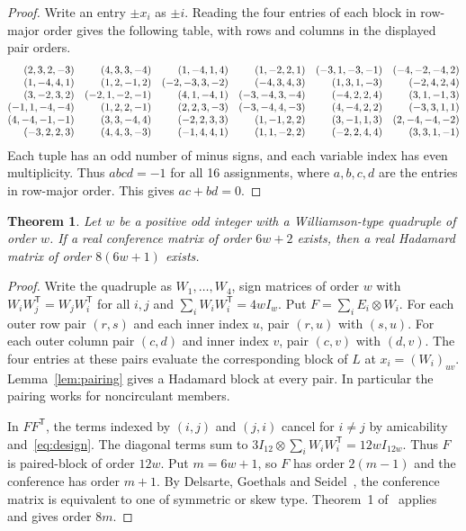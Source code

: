 \documentclass[10pt]{article}
\newtheorem{theorem}{Theorem}
\newcommand{\tr}{^{\mathsf T}}
\begin{document}
\begin{proof}
Write an entry $\pm x_i$ as $\pm i$. Reading the four entries of each block in row-major order gives the following table, with rows and columns in the displayed pair orders.
{\small
\[
\begin{array}{@{}rrrrrr@{}}
(2,3,2,-3)&(4,3,3,-4)&(1,-4,1,4)&(1,-2,2,1)&(-3,1,-3,-1)&(-4,-2,-4,2)\\
(1,-4,4,1)&(1,2,-1,2)&(-2,-3,3,-2)&(-4,3,4,3)&(1,3,1,-3)&(-2,4,2,4)\\
(3,-2,3,2)&(-2,1,-2,-1)&(4,1,-4,1)&(-3,-4,3,-4)&(-4,2,2,4)&(3,1,-1,3)\\
(-1,1,-4,-4)&(1,2,2,-1)&(2,2,3,-3)&(-3,-4,4,-3)&(4,-4,2,2)&(-3,3,1,1)\\
(4,-4,-1,-1)&(3,3,-4,4)&(-2,2,3,3)&(1,-1,2,2)&(3,-1,1,3)&(2,-4,-4,-2)\\
(-3,2,2,3)&(4,4,3,-3)&(-1,4,4,1)&(1,1,-2,2)&(-2,2,4,4)&(3,3,1,-1)
\end{array}
\]}
Each tuple has an odd number of minus signs, and each variable index has even multiplicity. Thus $abcd=-1$ for all 16 assignments, where $a,b,c,d$ are the entries in row-major order. This gives $ac+bd=0$.
\end{proof}

\begin{theorem}\label{thm:general}
Let $w$ be a positive odd integer with a Williamson-type quadruple of order $w$. If a real conference matrix of order $6w+2$ exists, then a real Hadamard matrix of order $8(6w+1)$ exists.
\end{theorem}

\begin{proof}
Write the quadruple as $W_1,\dots,W_4$, sign matrices of order $w$ with $W_iW_j\tr=W_jW_i\tr$ for all $i,j$ and $\sum_i W_iW_i\tr=4wI_w$. Put $F=\sum_i E_i\otimes W_i$. For each outer row pair $(r,s)$ and each inner index $u$, pair $(r,u)$ with $(s,u)$. For each outer column pair $(c,d)$ and inner index $v$, pair $(c,v)$ with $(d,v)$. The four entries at these pairs evaluate the corresponding block of $L$ at $x_i=(W_i)_{uv}$. Lemma~\ref{lem:pairing} gives a Hadamard block at every pair. In particular the pairing works for noncirculant members.

In $FF\tr$, the terms indexed by $(i,j)$ and $(j,i)$ cancel for $i\ne j$ by amicability and~\eqref{eq:design}. The diagonal terms sum to $3I_{12}\otimes\sum_i W_iW_i\tr=12wI_{12w}$. Thus $F$ is paired-block of order $12w$. Put $m=6w+1$, so $F$ has order $2(m-1)$ and the conference has order $m+1$. By Delsarte, Goethals and Seidel~\cite[Corollary~2.2]{DGS71}, the conference matrix is equivalent to one of symmetric or skew type. Theorem~1 of~\cite{Kl4792} applies and gives order $8m$.
\end{proof}
\end{document}
